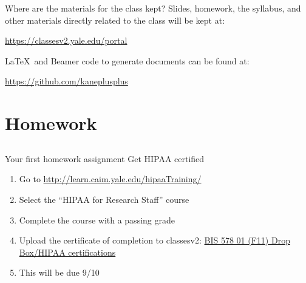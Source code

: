 \documentclass[14pt]{beamer}
\begin{document}
\begin{frame}{Where are the materials for the class kept?}
Slides, homework, the syllabus, and other materials directly related
to the class will be kept at:

\begin{center}
\url{https://classesv2.yale.edu/portal}
\end{center}

\LaTeX \ and Beamer code to generate documents can be found at:
\begin{center}
\url{https://github.com/kaneplusplus}
\end{center}
\end{frame}

\begin{frame}
\begin{center}
\end{center}
\end{frame}

\section{Homework}

\subsection*{}

\begin{frame}{Your first homework assignment}
Get HIPAA certified
\begin{enumerate}
\item Go to \url{http://learn.caim.yale.edu/hipaaTraining/}
\item Select the ``HIPAA for Research Staff'' course
\item Complete the course with a passing grade
\item Upload the certificate of completion to classesv2:
  \url{BIS 578 01 (F11) Drop Box/HIPAA certifications}
\item This will be due 9/10
\end{enumerate}
\end{frame}
\end{document}
